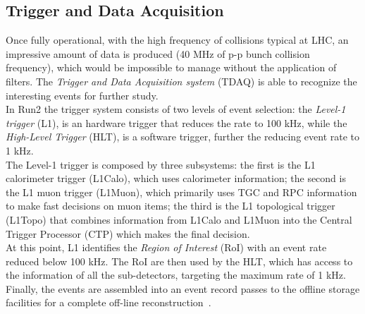 \subsection{Trigger and Data Acquisition}
\label{sec:TrigSys}
Once fully operational, with the high frequency of collisions typical at LHC, an impressive amount of data is produced (40 MHz of p-p bunch collision frequency), 
which would be impossible to manage without the application of filters.
The \textit{Trigger and Data Acquisition system} (TDAQ) is able to recognize the interesting events for further study.\\
In Run2 the trigger system consists of two levels of event selection: the \textit{Level-1 trigger} (L1), is an hardware trigger that reduces the rate to 100 kHz, while the 
\textit{High-Level Trigger} (HLT), is a software trigger, further the reducing event rate to 1 kHz.\\
The Level-1 trigger is composed by three subsystems: 
the first is the L1 calorimeter trigger (L1Calo), which uses calorimeter information; 
the second is the L1 muon trigger (L1Muon), which primarily uses TGC and RPC information to make fast decisions on muon items; 
the third is the L1 topological trigger (L1Topo) that combines information from L1Calo and L1Muon into the Central Trigger Processor (CTP) which makes the final decision.\\
At this point, L1 identifies the \textit{Region of Interest} (RoI) with an event rate reduced  below 100 kHz.
The RoI are then used by the HLT, which has access to the information of all the sub-detectors, targeting the maximum rate of 1 kHz.\\
Finally, the events are assembled into an event record passes to the offline storage facilities for a complete off-line reconstruction~\cite{TrigSys}.





